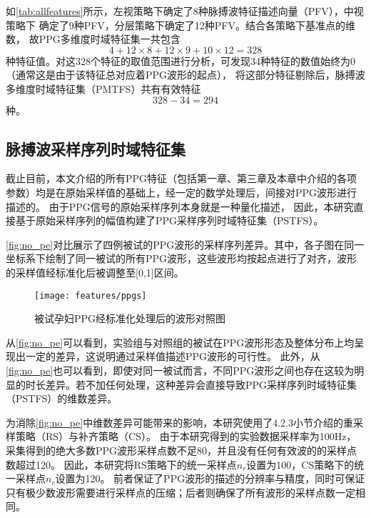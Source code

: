 如\autoref{tab:allfeatures}所示，左视策略下确定了8种脉搏波特征描述向量（PFV），中视策略下
确定了9种PFV，分层策略下确定了12种PFV。结合各策略下基准点的维数，
故PPG多维度时域特征集一共包含
\begin{equation}
    \label{equ:fn0}
    4+12 \times 8+12 \times 9+10 \times 12=328
\end{equation}
种特征值。对这328个特征的取值范围进行分析，可发现34种特征的数值始终为0（通常这是由于该特征总对应着PPG波形的起点），
将这部分特征剔除后，脉搏波多维度时域特征集（PMTFS）共有有效特征
\begin{equation}
    \label{equ:fn1}
    328-34=294
\end{equation}
种。

\subsection{脉搏波采样序列时域特征集}

截止目前，本文介绍的所有PPG特征（包括第一章、第三章及本章中介绍的各项参数）均是在原始采样值的基础上，经一定的数学处理后，间接对PPG波形进行描述的。
由于PPG信号的原始采样序列本身就是一种量化描述，
因此，本研究直接基于原始采样序列的幅值构建了PPG采样序列时域特征集（PSTFS）。

\autoref{fig:no_pe}对比展示了四例被试的PPG波形的采样序列差异。其中，各子图在同一坐标系下绘制了同一被试的所有PPG波形，这些波形均按起点进行了对齐，波形的采样值经标准化后被调整至[0,1]区间。

\begin{figure}[htbp]
    \centering
    \texttt{[image: features/ppgs]}
    \caption{\label{fig:no_pe}被试孕妇PPG经标准化处理后的波形对照图}
\end{figure}

从\autoref{fig:no_pe}可以看到，实验组与对照组的被试在PPG波形形态及整体分布上均呈现出一定的差异，这说明通过采样值描述PPG波形的可行性。
此外，从\autoref{fig:no_pe}也可以看到，即使对同一被试而言，不同PPG波形之间也存在这较为明显的时长差异。若不加任何处理，这种差异会直接导致PPG采样序列时域特征集（PSTFS）的维数差异。

为消除\autoref{fig:no_pe}中维数差异可能带来的影响，本研究使用了4.2.3小节介绍的重采样策略（RS）与补齐策略（CS）。
由于本研究得到的实验数据采样率为100Hz，采集得到的绝大多数PPG波形采样点数不足80，并且没有任何有效波的的采样点数超过120。
因此，本研究将RS策略下的统一采样点$n_r$设置为100，CS策略下的统一采样点$n_c$设置为120。
前者保证了PPG波形的描述的分辨率与精度，同时可保证只有极少数波形需要进行采样点的压缩；后者则确保了所有波形的采样点数一定相同。

